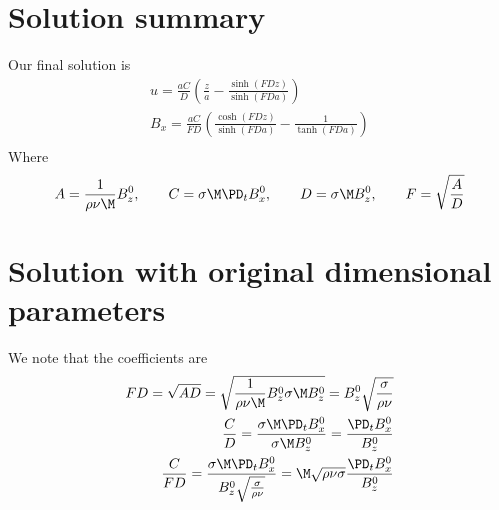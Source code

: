 \documentclass[11pt]{article}
\begin{document}
\section{Solution summary}
Our final solution is
\begin{equation}\begin{aligned}
u   = \frac{aC}{D}  \left( \frac{z}{a} - \frac{\sinh(FD z)}{\sinh(FD a)} \right) \\
B_x = \frac{aC}{FD} \left( \frac{\cosh(FD z)}{\sinh(FD a)} - \frac{1}{\tanh(FD a)} \right) \\
\end{aligned} \end{equation}
Where
\begin{equation}\begin{aligned}
A = \frac{1}{\rho \nu \M} B_z^0, \qquad
C = \sigma \M \PD_t B_x^0, \qquad
D = \sigma \M B_z^0, \qquad
F = \sqrt{\frac{A}{D}} \\
\end{aligned} \end{equation}

\section{Solution with original dimensional parameters}
We note that the coefficients are
\begin{equation}\begin{aligned}
FD = \sqrt{AD} = \sqrt{\frac{1}{\rho \nu \M} B_z^0 \sigma \M B_z^0} = B_z^0 \sqrt{\frac{\sigma}{\rho \nu}} \\
\frac{C}{D} = \frac{\sigma \M \PD_t B_x^0}{\sigma \M B_z^0} = \frac{\PD_t B_x^0}{ B_z^0} \\
\frac{C}{FD} = \frac{\sigma \M \PD_t B_x^0}{B_z^0 \sqrt{\frac{\sigma}{\rho \nu}}} = \M \sqrt{\rho \nu \sigma} \frac{\PD_t B_x^0}{B_z^0} \\
\end{aligned} \end{equation}
\end{document}
